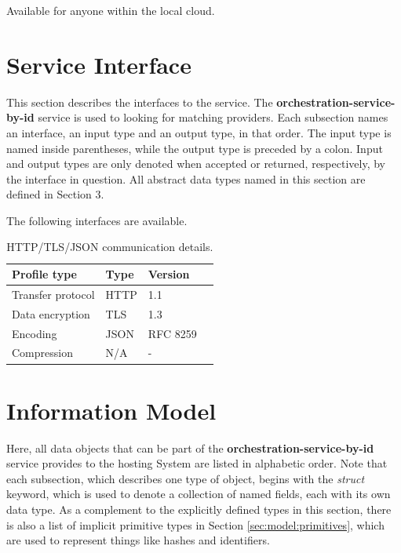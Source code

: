 \documentclass[a4paper]{arrowhead}
\begin{document}
Available for anyone within the local cloud.

\newpage

\section{Service Interface}
\label{sec:functions}

This section describes the interfaces to the service. The \textbf{orchestration-service-by-id} service is used to looking for matching providers. Each subsection names an interface, an input type and an output type, in that order.
The input type is named inside parentheses, while the output type is preceded by a colon.
Input and output types are only denoted when accepted or returned, respectively, by the interface in question. All abstract data types named in this section are defined in Section 3.

The following interfaces are available.


\begin{table}[ht!]
  \centering
  \begin{tabular}{|l|l|l|l|}
    \rowcolor{gray!33} Profile type & Type & Version \\ \hline
    Transfer protocol & HTTP & 1.1 \\ \hline
    Data encryption & TLS & 1.3 \\ \hline
    Encoding & JSON & RFC 8259 \cite{rfc8259} \\ \hline
    Compression & N/A & - \\ \hline
  \end{tabular}
  \caption{HTTP/TLS/JSON communication details.}
  \label{tab:comunication_semantics_profile}
\end{table}

\clearpage

\section{Information Model}
\label{sec:model}

Here, all data objects that can be part of the \textbf{orchestration-service-by-id} service
provides to the hosting System are listed in alphabetic order.
Note that each subsection, which describes one type of object, begins with the \textit{struct} keyword, which is used to denote a collection of named fields, each with its own data type.
As a complement to the explicitly defined types in this section, there is also a list of implicit primitive types in Section \ref{sec:model:primitives}, which are used to represent things like hashes and identifiers.
\end{document}
